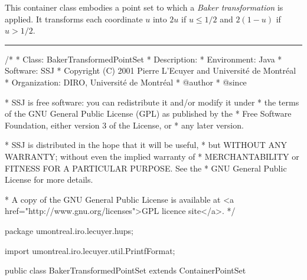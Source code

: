
This container class embodies a point set to which a
\emph{Baker transformation} is applied.
It transforms each coordinate $u$ into $2u$ if $u \le 1/2$
and $2(1-u)$ if $u > 1/2$.


\bigskip\hrule\bigskip

\begin{code}
\begin{hide}
/*
 * Class:        BakerTransformedPointSet
 * Description:  
 * Environment:  Java
 * Software:     SSJ 
 * Copyright (C) 2001  Pierre L'Ecuyer and Université de Montréal
 * Organization: DIRO, Université de Montréal
 * @author       
 * @since

 * SSJ is free software: you can redistribute it and/or modify it under
 * the terms of the GNU General Public License (GPL) as published by the
 * Free Software Foundation, either version 3 of the License, or
 * any later version.

 * SSJ is distributed in the hope that it will be useful,
 * but WITHOUT ANY WARRANTY; without even the implied warranty of
 * MERCHANTABILITY or FITNESS FOR A PARTICULAR PURPOSE.  See the
 * GNU General Public License for more details.

 * A copy of the GNU General Public License is available at
   <a href="http://www.gnu.org/licenses">GPL licence site</a>.
 */
\end{hide}
package umontreal.iro.lecuyer.hups;\begin{hide}

import umontreal.iro.lecuyer.util.PrintfFormat;
\end{hide}

public class BakerTransformedPointSet extends ContainerPointSet \begin{hide} {
\end{hide}
\end{code}

